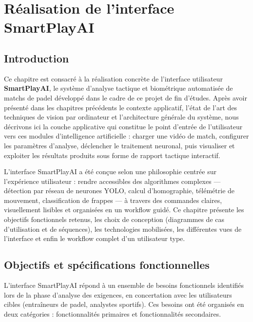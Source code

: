  
\chapter{Réalisation de l'interface SmartPlayAI}
 
\section{Introduction}
 
Ce chapitre est consacré à la réalisation concrète de l'interface utilisateur \textbf{SmartPlayAI},
le système d'analyse tactique et biométrique automatisée de matchs de padel développé dans le
cadre de ce projet de fin d'études. Après avoir présenté dans les chapitres précédents le
contexte applicatif, l'état de l'art des techniques de vision par ordinateur et l'architecture
générale du système, nous décrivons ici la couche applicative qui constitue le point d'entrée
de l'utilisateur vers ces modules d'intelligence artificielle : charger une vidéo de match,
configurer les paramètres d'analyse, déclencher le traitement neuronal, puis visualiser et
exploiter les résultats produits sous forme de rapport tactique interactif.
 
L'interface SmartPlayAI a été conçue selon une philosophie centrée sur l'expérience utilisateur :
rendre accessibles des algorithmes complexes — détection par réseau de neurones YOLO, calcul
d'homographie, télémétrie de mouvement, classification de frappes — à travers des commandes
claires, visuellement lisibles et organisées en un workflow guidé. Ce chapitre présente les
objectifs fonctionnels retenus, les choix de conception (diagrammes de cas d'utilisation et de
séquences), les technologies mobilisées, les différentes vues de l'interface et enfin le
workflow complet d'un utilisateur type.
 
\section{Objectifs et spécifications fonctionnelles}
 
L'interface SmartPlayAI répond à un ensemble de besoins fonctionnels identifiés lors de la phase
d'analyse des exigences, en concertation avec les utilisateurs cibles (entraîneurs de padel,
analystes sportifs). Ces besoins ont été organisés en deux catégories : fonctionnalités
primaires et fonctionnalités secondaires.
 
